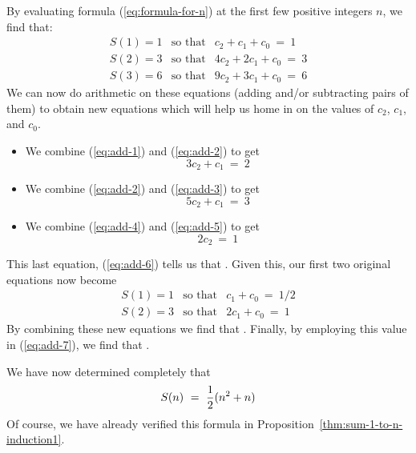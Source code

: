 \noindent By evaluating formula (\ref{eq:formula-for-n}) at the first
few positive integers $n$, we find that:
\begin{eqnarray}
\label{eq:add-1}
S(1) = 1
 & \mbox{so that} &
 c_2 + c_1 + c_0 \ = \ 1 \\
\label{eq:add-2}
S(2) = 3
 & \mbox{so that} &
 4 c_2 + 2 c_1 + c_0 \ = \ 3 \\
\label{eq:add-3}
S(3) = 6
 & \mbox{so that} &
 9 c_2 + 3 c_1 + c_0 \ = \ 6
\end{eqnarray}
We can now do arithmetic on these equations (adding and/or subtracting
pairs of them) to obtain new equations which will help us home in on
the values of $c_2$, $c_1$, and $c_0$.
\begin{itemize}
\item
We combine (\ref{eq:add-1}) and (\ref{eq:add-2}) to get
\begin{equation}
\label{eq:add-4}
3c_2 + c_1 \ = \ 2
\end{equation}

\item
We combine (\ref{eq:add-2}) and (\ref{eq:add-3}) to get
\begin{equation}
\label{eq:add-5}
5 c_2 + c_1 \ = \ 3
\end{equation}

\item
We combine (\ref{eq:add-4}) and (\ref{eq:add-5}) to get
\begin{equation}
\label{eq:add-6}
2 c_2 \ = \ 1
\end{equation}
\end{itemize}
This last equation, (\ref{eq:add-6}) tells us that .  Given this, our first two original equations now
become
\begin{eqnarray}
\label{eq:add-7}
S(1) = 1
 & \mbox{so that} &
c_1 + c_0 \ = \ 1/2 \\
\label{eq:add-8}
S(2) = 3
 & \mbox{so that} &
2 c_1 + c_0 \ = \ 1
\end{eqnarray}
By combining these new equations we find that .  Finally, by employing this value in (\ref{eq:add-7}), we
find that .

\medskip

We have now determined completely that
\[ S(n) \ = \ {1 \over 2}(n^2 + n) \]
Of course, we have already verified this formula in
Proposition~\ref{thm:sum-1-to-n-induction1}.

